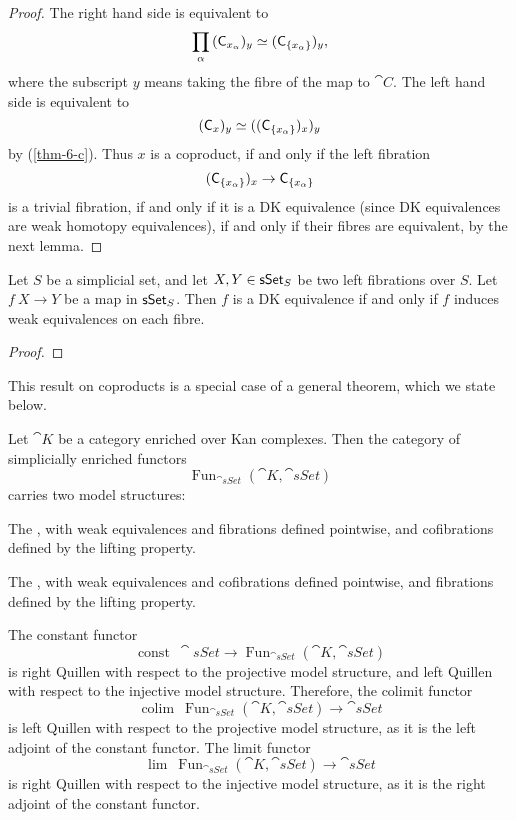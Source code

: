 \begin{proof}
    The right hand side is equivalent to  
    \[ \prod_\alpha{}(\mathsf{C}_{x_\alpha\/})_y
    \simeq (\mathsf{C}_{\{x_\alpha\}\/})_y, \]
    where the subscript $y$ means taking the fibre of the map to $\cat C$.
    The left hand side is equivalent to 
    \[ (\mathsf{C}_{x\/})_y\simeq((\mathsf{C}_{\{x_\alpha\}\/})_{x\/})_y \]
    by (\ref{thm-6-c}). Thus $x$ is a coproduct, if and only if the left fibration
    \[(\mathsf{C}_{\{x_\alpha\}\/})_{x\/}\to\mathsf{C}_{\{x_\alpha\}\/}\]
    is a trivial fibration,
    if and only if it is a DK equivalence (since DK equivalences are weak homotopy equivalences),
    if and only if their fibres are equivalent, by the next lemma.
\end{proof}

\begin{lemma}
    Let $S$ be a simplicial set, and let $X,Y\in\mathsf{sSet}_{\/S}$
    be two left fibrations over $S$.
    Let $f\:X\to Y$ be a map in $\mathsf{sSet}_{\/S}$.
    Then $f$ is a DK equivalence if and only if 
    $f$ induces weak equivalences on each fibre.
\end{lemma}

\begin{proof}
    \nyw
\end{proof}

This result on coproducts is a special case of a general theorem,
which we state below.

Let $\cat K$ be a category enriched over Kan complexes.
Then the category of simplicially enriched functors
\[ \operatorname{Fun}_{\cat{sSet}}(\cat K,\cat{sSet}) \]
carries two model structures:
\begin{itms}
    \item The ,
    with weak equivalences and fibrations defined pointwise,
    and cofibrations defined by the lifting property.
    \item The ,
    with weak equivalences and cofibrations defined pointwise,
    and fibrations defined by the lifting property.
\end{itms}
The constant functor
\[ \operatorname{const}\:\cat{sSet}\to\operatorname{Fun}_{\cat{sSet}}(\cat K,\cat{sSet}) \]
is right Quillen with respect to the projective model structure,
and left Quillen with respect to the injective model structure.
Therefore, the colimit functor 
\[ \operatorname{colim}\:\operatorname{Fun}_{\cat{sSet}}(\cat K,\cat{sSet})\to\cat{sSet} \]
is left Quillen with respect to the projective model structure,
as it is the left adjoint of the constant functor.
The limit functor 
\[ \operatorname{lim}\:\operatorname{Fun}_{\cat{sSet}}(\cat K,\cat{sSet})\to\cat{sSet} \]
is right Quillen with respect to the injective model structure,
as it is the right adjoint of the constant functor.

